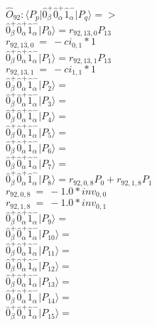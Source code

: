 \documentclass[14pt]{article}
\begin{document}
    $\hat{O}_{92}:  \langle{P_p}\vert \hat{0}_{\beta}^{+}\hat{0}_{\alpha}^{+}\hat{1}_{\alpha}^{-} \vert{P_q}\rangle => $ \\ 
    $ \hat{0}_{\beta}^{+}\hat{0}_{\alpha}^{+}\hat{1}_{\alpha}^{-} \vert{P_{0}}\rangle = {r}_{92,13,0}P_{13} $ \\ 
    ${r}_{92,13,0}\ =\ -{ci}_{0,1}*1 $ \\ 
    $ \hat{0}_{\beta}^{+}\hat{0}_{\alpha}^{+}\hat{1}_{\alpha}^{-} \vert{P_{1}}\rangle = {r}_{92,13,1}P_{13} $ \\ 
    ${r}_{92,13,1}\ =\ -{ci}_{1,1}*1 $ \\ 
    $ \hat{0}_{\beta}^{+}\hat{0}_{\alpha}^{+}\hat{1}_{\alpha}^{-} \vert{P_{2}}\rangle =  $ \\ 
    $ \hat{0}_{\beta}^{+}\hat{0}_{\alpha}^{+}\hat{1}_{\alpha}^{-} \vert{P_{3}}\rangle =  $ \\ 
    $ \hat{0}_{\beta}^{+}\hat{0}_{\alpha}^{+}\hat{1}_{\alpha}^{-} \vert{P_{4}}\rangle =  $ \\ 
    $ \hat{0}_{\beta}^{+}\hat{0}_{\alpha}^{+}\hat{1}_{\alpha}^{-} \vert{P_{5}}\rangle =  $ \\ 
    $ \hat{0}_{\beta}^{+}\hat{0}_{\alpha}^{+}\hat{1}_{\alpha}^{-} \vert{P_{6}}\rangle =  $ \\ 
    $ \hat{0}_{\beta}^{+}\hat{0}_{\alpha}^{+}\hat{1}_{\alpha}^{-} \vert{P_{7}}\rangle =  $ \\ 
    $ \hat{0}_{\beta}^{+}\hat{0}_{\alpha}^{+}\hat{1}_{\alpha}^{-} \vert{P_{8}}\rangle = {r}_{92,0,8}P_{0}+{r}_{92,1,8}P_{1} $ \\ 
    ${r}_{92,0,8}\ =\ -1.0*{inv}_{0,0} $ \\ 
    ${r}_{92,1,8}\ =\ -1.0*{inv}_{0,1} $ \\ 
    $ \hat{0}_{\beta}^{+}\hat{0}_{\alpha}^{+}\hat{1}_{\alpha}^{-} \vert{P_{9}}\rangle =  $ \\ 
    $ \hat{0}_{\beta}^{+}\hat{0}_{\alpha}^{+}\hat{1}_{\alpha}^{-} \vert{P_{10}}\rangle =  $ \\ 
    $ \hat{0}_{\beta}^{+}\hat{0}_{\alpha}^{+}\hat{1}_{\alpha}^{-} \vert{P_{11}}\rangle =  $ \\ 
    $ \hat{0}_{\beta}^{+}\hat{0}_{\alpha}^{+}\hat{1}_{\alpha}^{-} \vert{P_{12}}\rangle =  $ \\ 
    $ \hat{0}_{\beta}^{+}\hat{0}_{\alpha}^{+}\hat{1}_{\alpha}^{-} \vert{P_{13}}\rangle =  $ \\ 
    $ \hat{0}_{\beta}^{+}\hat{0}_{\alpha}^{+}\hat{1}_{\alpha}^{-} \vert{P_{14}}\rangle =  $ \\ 
    $ \hat{0}_{\beta}^{+}\hat{0}_{\alpha}^{+}\hat{1}_{\alpha}^{-} \vert{P_{15}}\rangle =  $ \\ 
    
\end{document}
